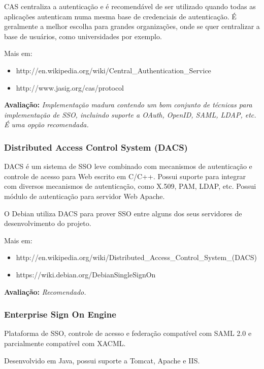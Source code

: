 \documentclass[11pt]{article}
\begin{document}
CAS centraliza a autenticação e é recomendável de ser utilizado quando todas
as aplicações autenticam numa mesma base de credenciais de autenticação. É
geralmente a melhor escolha para grandes organizações, onde se quer
centralizar a base de usuários, como universidades por exemplo.

Mais em:
\begin{itemize}
  \item{http://en.wikipedia.org/wiki/Central\_Authentication\_Service}
  \item{http://www.jasig.org/cas/protocol}
\end{itemize}

{\bf Avaliação:} {\it Implementação madura contendo um bom conjunto de
técnicas para implementação de SSO, incluindo suporte a OAuth, OpenID, SAML, LDAP,
etc. É uma opção recomendada.}

\subsubsection{Distributed Access Control System (DACS)}

DACS é um sistema de SSO leve combinado com mecanismos de autenticação e
controle de acesso para Web escrito em C/C++. Possui suporte para integrar com
diversos mecanismos de autenticação, como X.509, PAM, LDAP, etc. Possui módulo
de autenticação para servidor Web Apache\cite{webServicesRoleBased}.

O Debian utiliza DACS para prover SSO entre alguns dos seus servidores de
desenvolvimento do projeto.

Mais em:
\begin{itemize}
  \item{http://en.wikipedia.org/wiki/Distributed\_Access\_Control\_System\_(DACS)}
  \item{https://wiki.debian.org/DebianSingleSignOn}
\end{itemize}

{\bf Avaliação:} {\it Recomendado.}

\subsubsection{Enterprise Sign On Engine}

Plataforma de SSO, controle de acesso e federação compatível com SAML 2.0
e parcialmente compatível com
XACML\cite{wikipediaXACML}.

Desenvolvido em Java, possui suporte a Tomcat, Apache e IIS.
\end{document}
